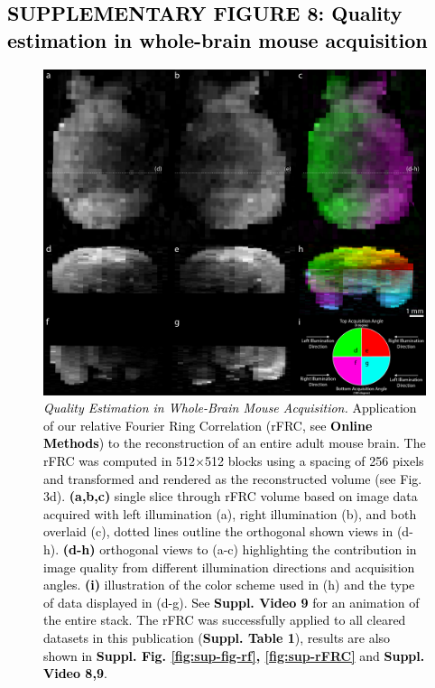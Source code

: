 \documentclass[]{spie}  %
\def\red{\textcolor{black}}
\begin{document}
\pagebreak

\subsection*{\red{SUPPLEMENTARY FIGURE 8: Quality estimation in whole-brain mouse acquisition}}
\vspace{1mm}
\begin{figure}[h!]
\includegraphics[width=\textwidth]{rFRC_brain.png}
\vspace{-2.0mm}
\caption{\hspace{-0.5mm} \red{\emph{Quality Estimation in Whole-Brain Mouse Acquisition.} Application of our relative Fourier Ring Correlation (rFRC, see \textbf{Online Methods}) to the reconstruction of an entire adult mouse brain. The rFRC was computed in 512$\times$512 blocks using a spacing of 256 pixels and transformed and rendered as the reconstructed volume (see Fig. 3d). \textbf{(a,b,c)} single slice through rFRC volume based on image data acquired with left illumination (a), right illumination (b), and both overlaid (c), dotted lines outline the orthogonal shown views in (d-h). \textbf{(d-h)} orthogonal views to (a-c) highlighting the contribution in image quality from different illumination directions and acquisition angles. \textbf{(i)} illustration of the color scheme used in (h) and the type of data displayed in (d-g). See \textbf{Suppl. Video 9} for an animation of the entire stack. The rFRC was successfully applied to all cleared datasets in this publication (\textbf{Suppl. Table 1}), results are also shown in \textbf{Suppl. Fig. \ref{fig:sup-fig-rf}, \ref{fig:sup-rFRC}} and \textbf{Suppl. Video 8,9}.
}}
\label{fig:sup-rfrc-brain}
\end{figure}
\end{document}
